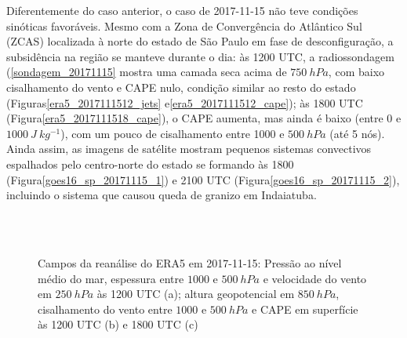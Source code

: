 Diferentemente do caso anterior, o caso de 2017-11-15 não teve condições sinóticas favoráveis. Mesmo com a Zona de Convergência do Atlântico Sul (ZCAS) localizada à norte do estado de São Paulo em fase de desconfiguração, a subsidência na região se manteve durante o dia: às 1200 UTC, a radiossondagem (\autoref{sondagem_20171115} mostra uma camada seca acima de $750\:hPa$, com baixo cisalhamento do vento e CAPE nulo, condição similar ao resto do estado (Figuras\autoref{era5_2017111512_jets} e\autoref{era5_2017111512_cape}); às 1800 UTC (Figura\autoref{era5_2017111518_cape}), o CAPE aumenta, mas ainda é baixo (entre 0 e $1000\:J\:kg^{-1}$), com um pouco de cisalhamento entre 1000 e $500\:hPa$ (até 5 nós). Ainda assim, as imagens de satélite mostram pequenos sistemas convectivos espalhados pelo centro-norte do estado se formando às 1800 (Figura\autoref{goes16_sp_20171115_1}) e 2100 UTC (Figura\autoref{goes16_sp_20171115_2}), incluindo o sistema que causou queda de granizo em Indaiatuba.

\begin{figure}[htb]
	\begin{center}
		\caption{Campos da reanálise do ERA5 em 2017-11-15: Pressão ao nível médio do mar, espessura entre $1000$ e $500\:hPa$ e velocidade do vento em $250\:hPa$ às 1200 UTC (a); altura geopotencial em $850\:hPa$, cisalhamento do vento entre $1000$ e $500\:hPa$ e CAPE em superfície às 1200 UTC (b) e 1800 UTC (c)} 
		\label{era5_20171115_main}
		 \\
		 \\
	\end{center}
\end{figure}


